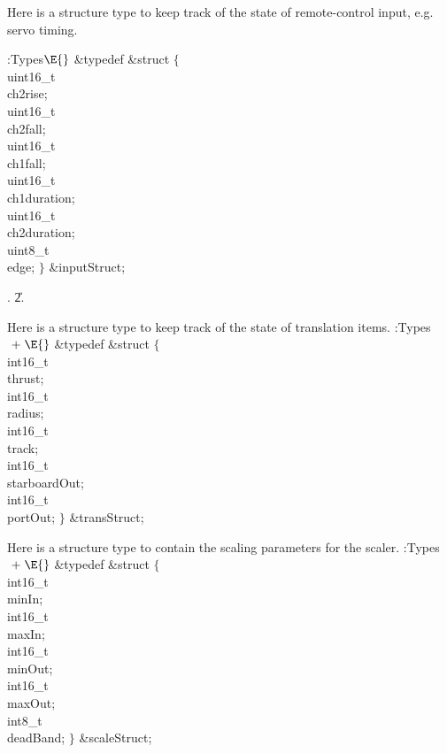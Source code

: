 Here is a structure type to keep track of the state of remote-control
input, e.g. servo timing.

\Y\B\4:Types\X${}\E{}$\6
\&{typedef} \&{struct} ${}\{{}$\1\6
\\{uint16\_t}\\{ch2rise};\6
\\{uint16\_t}\\{ch2fall};\6
\\{uint16\_t}\\{ch1fall};\6
\\{uint16\_t}\\{ch1duration};\6
\\{uint16\_t}\\{ch2duration};\6
\\{uint8\_t}\\{edge};\2\6
${}\}{}$ \&{inputStruct};\par
{}.
\U2.\fi

Here is a structure type to keep track of the state of translation items.
\Y\B\4:Types\X${}\mathrel+\E{}$\6
\&{typedef} \&{struct} ${}\{{}$\1\6
\\{int16\_t}\\{thrust};\6
\\{int16\_t}\\{radius};\6
\\{int16\_t}\\{track};\6
\\{int16\_t}\\{starboardOut};\6
\\{int16\_t}\\{portOut};\2\6
${}\}{}$ \&{transStruct};\par
\fi

Here is a structure type to contain the scaling parameters for the scaler.
\Y\B\4:Types\X${}\mathrel+\E{}$\6
\&{typedef} \&{struct} ${}\{{}$\1\6
\\{int16\_t}\\{minIn};\6
\\{int16\_t}\\{maxIn};\6
\\{int16\_t}\\{minOut};\6
\\{int16\_t}\\{maxOut};\6
\\{int8\_t}\\{deadBand};\2\6
${}\}{}$ \&{scaleStruct};\par
\fi

